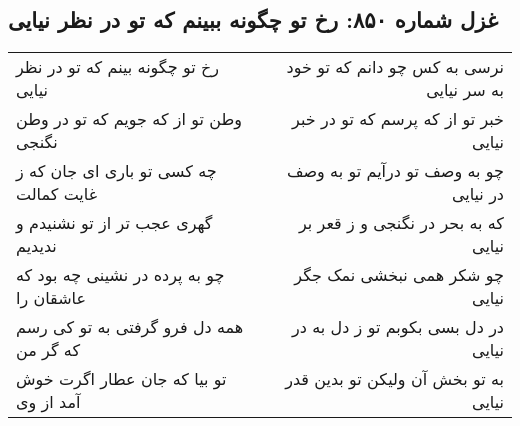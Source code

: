 \begin{center}
\section*{غزل شماره ۸۵۰: رخ تو چگونه ببینم که تو در نظر نیایی}
\label{sec:850}
\begin{longtable}{l p{0.5cm} r}
رخ تو چگونه بینم که تو در نظر نیایی
&&
نرسی به کس چو دانم که تو خود به سر نیایی
\\
وطن تو از که جویم که تو در وطن نگنجی
&&
خبر تو از که پرسم که تو در خبر نیایی
\\
چه کسی تو باری ای جان که ز غایت کمالت
&&
چو به وصف تو درآیم تو به وصف در نیایی
\\
گهری عجب تر از تو نشنیدم و ندیدیم
&&
که به بحر در نگنجی و ز قعر بر نیایی
\\
چو به پرده در نشینی چه بود که عاشقان را
&&
چو شکر همی نبخشی نمک جگر نیایی
\\
همه دل فرو گرفتی به تو کی رسم که گر من
&&
در دل بسی بکوبم تو ز دل به در نیایی
\\
تو بیا که جان عطار اگرت خوش آمد از وی
&&
به تو بخش آن ولیکن تو بدین قدر نیایی
\\
\end{longtable}
\end{center}
